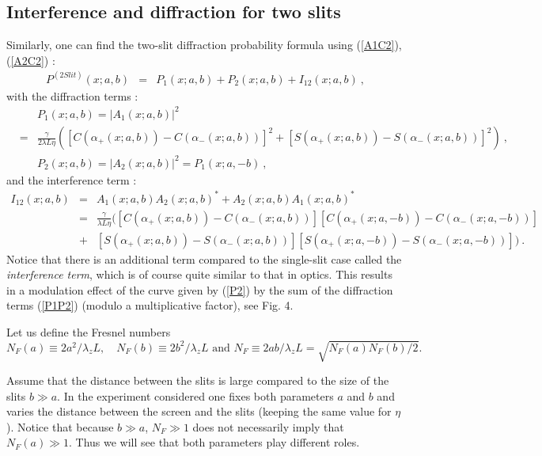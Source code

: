 \documentclass[12pt,aps,prb,preprint]{revtex4-1}   %
\begin{document}
\subsection{Interference and diffraction for two slits}
Similarly, one can find the two-slit diffraction probability
formula using (\ref{A1C2}), (\ref{A2C2}) :
\begin{eqnarray}\label{P2}
P^{(2 Slit)}(x;a,b) &=& P_1(x;a,b)+P_2(x;a,b)+I_{12}(x;a,b)\ ,
\end{eqnarray}
with the diffraction terms :
\begin{eqnarray}\label{P1P2}
&&P_1(x;a,b)= |A_1(x;a,b)|^2
{}\nonumber\\{}&=&\frac{\gamma}{2\lambda
L\eta}\left([C(\alpha_{+}(x;a,b))-C(\alpha_{-}(x;a,b))]^2+[S(\alpha_{+}(x;a,b))-S(\alpha_{-}(x;a,b))]^2\right)\
, {}\nonumber\\{}&& P_2(x;a,b) = |A_2(x;a,b)|^2 = P_1(x;a,-b)\ ,
\end{eqnarray}
and the interference term :
\begin{eqnarray}\label{I12}
I_{12}(x;a,b)&=&A_1(x;a,b)A_2(x;a,b)^* + A_2(x;a,b) A_1(x;a,b)^*
{}\nonumber\\{}&=&\frac{\gamma}{\lambda L\eta}
([C(\alpha_{+}(x;a,b))-C(\alpha_{-}(x;a,b))][C(\alpha_{+}(x;a,-b))-C(\alpha_{-}(x;a,-b))]
{}\nonumber\\{}&+&[S(\alpha_{+}(x;a,b))-S(\alpha_{-}(x;a,b))][S(\alpha_{+}(x;a,-b))-S(\alpha_{-}(x;a,-b))])\ .
\end{eqnarray}
Notice that there is an additional term compared to the
single-slit case called the \textit{interference term}, which is
of course quite similar to that in optics.\cite{Optics} This
results in a modulation effect of the curve given by (\ref{P2}) by
the sum of the diffraction terms (\ref{P1P2}) (modulo a
multiplicative factor), see Fig. 4.

Let us define the Fresnel numbers
$$ N_F(a)\equiv2a^2/\lambda_z L, \quad
N_F(b)\equiv2b^2/\lambda_z L \mbox{ and } N_F\equiv2ab/\lambda_z L =
\sqrt{N_F(a)N_F(b)/2}.  $$


Assume that the distance between the slits is large compared to
the size of the slits $b\gg a$. In the experiment considered one
fixes both parameters $a$ and $b$ and varies the distance between
the screen and the slits (keeping the same value for $\eta$).
Notice that because $b\gg a$, $N_F\gg 1$ does not necessarily
imply that $N_F(a)\gg1$. Thus we will see that both parameters
play different roles.
\end{document}
